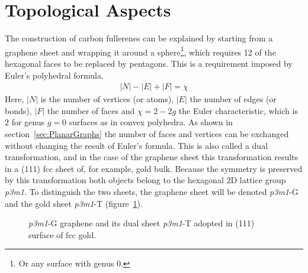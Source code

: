 \section{\label{sec:TopAsp}Topological Aspects}

The construction of carbon fullerenes can be explained by starting from a
graphene sheet and wrapping it around a sphere\footnote{Or any surface with
genus 0.}, which requires 12 of the hexagonal faces to be replaced by pentagons. This is a requirement imposed by Euler's polyhedral formula.
%
\begin{align}
    |N|-|E|+|F|=\chi
\end{align}
%
Here, $|N|$ is the number of vertices (or atoms), $|E|$ the number of edges (or
bonds), $|F|$ the number of faces and $\chi=2-2g$ the Euler characteristic,
which is $2$ for genus $g=0$ surfaces as in convex polyhedra. As shown in
section~\ref{sec:PlanarGraphs} the number of faces and vertices can be exchanged
without changing the result of Euler's formula. This is also called a dual
transformation, and in the case of the graphene sheet this transformation results in
a (111) \ac{fcc} sheet of, for example, gold bulk. Because the symmetry is
preserved by this transformation both objects belong to the hexagonal 2D lattice
group \textit{p3m1}. To distinguish the two sheets, the graphene sheet will be
denoted \textit{p3m1}-G and the gold sheet \textit{p3m1}-T (figure~\ref{fig:graphenedual}).

\begin{figure}[htb]
    \begin{center}
        \hspace{.05\textwidth}
        \caption{\protect{} \textit{p3m1}-G graphene and
        \protect{} its dual sheet \textit{p3m1}-T adopted in (111)
        surface of fcc gold.}
    \label{fig:graphenedual}
    \end{center}
\end{figure}

